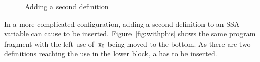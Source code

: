 \begin{figure}[htbp]
	\centering
	\hfill
	\hfill
	\label{fig:ex1}
	\caption{Adding a second definition}
\end{figure}

In a more complicated configuration, adding a second definition to an SSA variable can cause \phifuns to be inserted.
Figure~\ref{fig:withphis} shows the same program fragment with the left use of~$\mathtt{x}_0$ being moved to the bottom.
As there are two definitions reaching the use in the lower block, a \phifun has to be inserted. 

